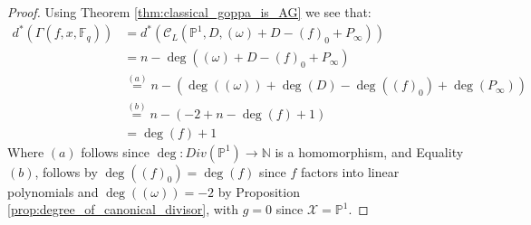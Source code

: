 \begin{proof}
  Using Theorem \ref{thm:classical_goppa_is_AG} we see that:
  \begin{align*}
    d^{*}(\Gamma(f, x, \mathbb{F}_q)) &=d^{*}(\mathcal{C}_L(\mathbb{P}^1, D, (\omega) + D - (f)_0 + P_{\infty}))\\
                                      &= n - \deg((\omega) + D - (f)_0 + P_{\infty}) \\
                                      &\stackrel{(a)}= n - \left(\deg((\omega)) + \deg(D) - \deg((f)_{0}) + \deg(P_{\infty})\right) \\
    &\stackrel{(b)}= n - \left(- 2 + n - \deg(f) + 1\right) \\
    &= \deg(f) + 1
  \end{align*}
  Where $(a)$ follows since $\deg\colon Div(\mathbb{P}^1) \to \mathbb{N}$ is a homomorphism, and Equality $(b)$, follows by $\deg((f)_0) = \deg(f)$ since $f$ factors into linear polynomials and $\deg((\omega)) = -2$ by Proposition \ref{prop:degree_of_canonical_divisor}, with $g = 0$ since $\mathcal{X} = \mathbb{P}^{1}$.
\end{proof}



